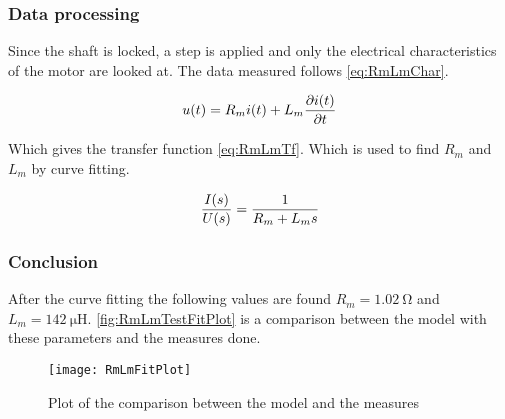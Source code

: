 \subsubsection*{Data processing}

Since the shaft is locked, a step is applied and only the electrical characteristics of the motor are looked at. The data measured follows \autoref{eq:RmLmChar}.

\begin{equation}\label{eq:RmLmChar}
	u(t)=R_m i(t)+L_m \frac{\partial i(t)}{\partial t} \addunit{\volt}
\end{equation}

Which gives the transfer function \autoref{eq:RmLmTf}. Which is used to find $R_m$ and $L_m$ by curve fitting.

\begin{equation}\label{eq:RmLmTf}
\frac{I(s)}{U(s)}=\frac{1}{R_m +L_m s} \addunit{1}
\end{equation}

\subsubsection*{Conclusion}

After the curve fitting the following values are found $R_m=\SI{1.02}{\ohm}$ and $L_m=\SI{142}{\micro\henry}$. \autoref{fig:RmLmTestFitPlot} is a comparison between the model with these parameters and the measures done.

\begin{figure}[htbp]
	\centering
	\texttt{[image: RmLmFitPlot]}
	\caption{Plot of the comparison between the model and the measures}\label{fig:RmLmTestFitPlot}
\end{figure}
